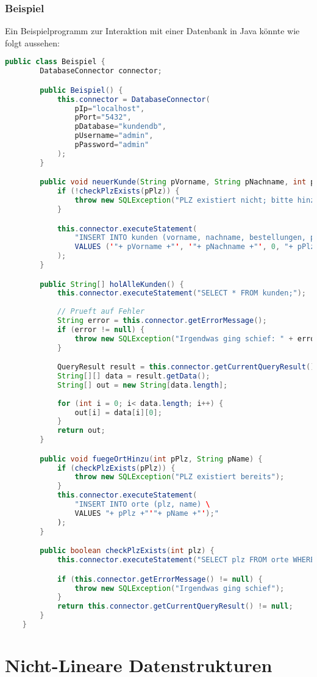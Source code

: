 \documentclass{article}
\begin{document}
	\subsubsection{Beispiel}
	Ein Beispielprogramm zur Interaktion mit einer Datenbank in Java könnte wie folgt aussehen:

	\begin{lstlisting}[language=Java]
	public class Beispiel {
		DatabaseConnector connector;

		public Beispiel() {
			this.connector = DatabaseConnector(
				pIp="localhost",
				pPort="5432",
				pDatabase="kundendb",
				pUsername="admin",
				pPassword="admin"
			);
		}

		public void neuerKunde(String pVorname, String pNachname, int pPlz) {
			if (!checkPlzExists(pPlz)) {
				throw new SQLException("PLZ existiert nicht; bitte hinzufuegen");
			}

			this.connector.executeStatement(
				"INSERT INTO kunden (vorname, nachname, bestellungen, plz) \
				VALUES ('"+ pVorname +"', '"+ pNachname +"', 0, "+ pPlz +");"
			);
		}

		public String[] holAlleKunden() {
			this.connector.executeStatement("SELECT * FROM kunden;");
		
			// Prueft auf Fehler
			String error = this.connector.getErrorMessage();
			if (error != null) {
				throw new SQLException("Irgendwas ging schief: " + error);
			}

			QueryResult result = this.connector.getCurrentQueryResult();
			String[][] data = result.getData();
			String[] out = new String[data.length];
		
			for (int i = 0; i< data.length; i++) {
				out[i] = data[i][0];
			}
			return out;
		}

		public void fuegeOrtHinzu(int pPlz, String pName) {
			if (checkPlzExists(pPlz)) {
				throw new SQLException("PLZ existiert bereits");
			}
			this.connector.executeStatement(
				"INSERT INTO orte (plz, name) \
				VALUES "+ pPlz +"'"+ pName +"');"
			);
		}

		public boolean checkPlzExists(int plz) {
			this.connector.executeStatement("SELECT plz FROM orte WHERE plz = " + String.valueOf(plz) + ";");

			if (this.connector.getErrorMessage() != null) {
				throw new SQLException("Irgendwas ging schief");
			}
			return this.connector.getCurrentQueryResult() != null;
		}
	}
	\end{lstlisting}


	\section{Nicht-Lineare Datenstrukturen}
	
\end{document}
